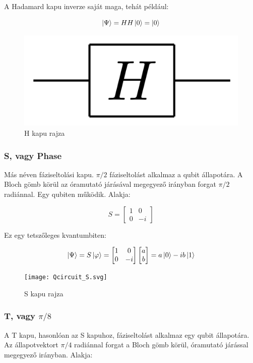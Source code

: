 \documentclass[
]{thesis-ekf}
\theoremstyle{definition}
\theoremstyle{remark}
\begin{document}
A Hadamard kapu inverze saját maga, tehát például:

\begin{equation}\label{hinverz}
	\ket{\Psi}=HH\ket{0}=\ket{0}
\end{equation}

\begin{figure}[H]
	\centering
	\includegraphics[width=0.3\linewidth]{Hadamard}
	\caption{H kapu rajza}
	\label{fig:hadamard}
\end{figure}


\subsubsection{S, vagy Phase}
Más néven fáziseltolási kapu. $\pi/2$ fáziseltolást alkalmaz a qubit állapotára. A Bloch gömb körül az óramutató járásával megegyező irányban forgat $\pi/2$ radiánnal. Egy qubiten működik. Alakja:

\begin{equation}
	S= 
	\begin{bmatrix}
		1 & 0\\
		0 & -i
	\end{bmatrix}
\end{equation}

Ez egy tetszőleges kvantumbiten:

\begin{equation}
	\ket{\Psi}=S\ket{\varphi}=
	\begin{bmatrix}
		1 & 0\\
		0 & -i
	\end{bmatrix}
	\begin{bmatrix}
		a\\
		b
	\end{bmatrix}=a\ket{0}-ib\ket{1}
\end{equation}

\begin{figure}[H]
	\centering
	\texttt{[image: Qcircuit\_S.svg]}
	\caption{S kapu rajza}
	\label{fig:qcircuits}
\end{figure}


\subsubsection{T, vagy $\pi/8$}
A T kapu, hasonlóan az S kapuhoz, fáziseltolást alkalmaz egy qubit állapotára. Az állapotvektort $\pi/4$ radiánnal forgat a Bloch gömb körül, óramutató járással megegyező irányban. Alakja:
\end{document}
